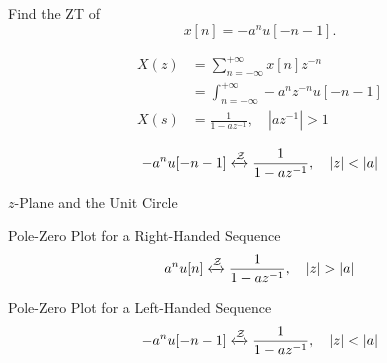 \begin{frame}[t]{}
    \begin{example}
        Find the ZT of
        \begin{equation*}
            x[n] = -a^nu[-n-1].
        \end{equation*}
    \end{example}
    \pause
    {
        \begin{solution}
            \begin{align*}
                X(z) &= \sum_{n=-\infty}^{+\infty}x[n]z^{-n}\\
                &= \int_{n=-\infty}^{+\infty}-a^nz^{-n}u[-n-1]\\
                X(s) &= \frac{1}{1-az^{-1}}, \quad |az^{-1}|>1\\
            \end{align*}
            \pause
            \begin{equation*}
                -a^nu[-n-1] \xleftrightarrow{\mathcal{Z}}   \frac{1}{1-az^{-1}}, \quad |z|< |a|
            \end{equation*}
        \end{solution}
    }
\end{frame}


\begin{frame}{$z$-Plane and the Unit Circle}
    {
        \begin{center}
            
        \end{center}
    }
\end{frame}

\begin{frame}{Pole-Zero Plot for a Right-Handed Sequence}
    \begin{equation*}
        a^nu[n] \xleftrightarrow{\mathcal{Z}}   \frac{1}{1-az^{-1}}, \quad |z|> |a|
    \end{equation*}
    {
        \begin{center}
            
        \end{center}
    }
\end{frame}


\begin{frame}{Pole-Zero Plot for a Left-Handed Sequence}
    \begin{equation*}
        -a^nu[-n-1] \xleftrightarrow{\mathcal{Z}}   \frac{1}{1-az^{-1}}, \quad |z|< |a|
    \end{equation*}
    {
        \begin{center}
            
        \end{center}
    }
\end{frame}

